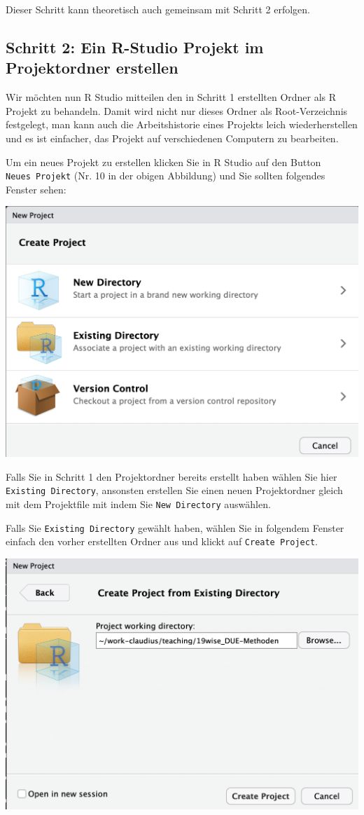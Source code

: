 \documentclass[]{book}
\begin{document}
Dieser Schritt kann theoretisch auch gemeinsam mit Schritt 2 erfolgen.

\subsection{Schritt 2: Ein R-Studio Projekt im Projektordner
erstellen}\label{schritt-2-ein-r-studio-projekt-im-projektordner-erstellen}

Wir möchten nun R Studio mitteilen den in Schritt 1 erstellten Ordner
als R Projekt zu behandeln. Damit wird nicht nur dieses Ordner als
Root-Verzeichnis festgelegt, man kann auch die Arbeitshistorie eines
Projekts leich wiederherstellen und es ist einfacher, das Projekt auf
verschiedenen Computern zu bearbeiten.

Um ein neues Projekt zu erstellen klicken Sie in R Studio auf den Button
\texttt{Neues\ Projekt} (Nr. 10 in der obigen Abbildung) und Sie sollten
folgendes Fenster sehen:

\begin{center}\includegraphics[width=0.6\linewidth]{figures/r-studio-new-project} \end{center}

Falls Sie in Schritt 1 den Projektordner bereits erstellt haben wählen
Sie hier \texttt{Existing\ Directory}, ansonsten erstellen Sie einen
neuen Projektordner gleich mit dem Projektfile mit indem Sie
\texttt{New\ Directory} auswählen.

Falls Sie \texttt{Existing\ Directory} gewählt haben, wählen Sie in
folgendem Fenster einfach den vorher erstellten Ordner aus und klickt
auf \texttt{Create\ Project}.

\begin{center}\includegraphics[width=0.6\linewidth]{figures/r-studio-new-project-exis-dir} \end{center}
\end{document}
